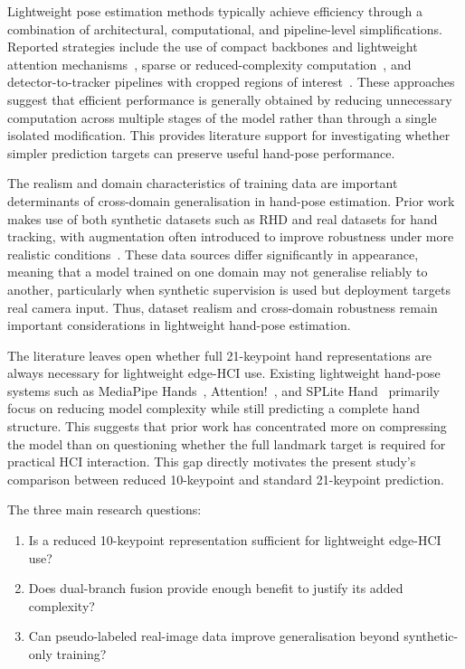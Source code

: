 ﻿\documentclass[10pt,letterpaper]{article}
\begin{document}
\medskip
Lightweight pose estimation methods typically achieve efficiency through a combination of architectural, computational, and pipeline-level simplifications. Reported strategies include the use of compact backbones and lightweight attention mechanisms~\cite{attentionlite}, sparse or reduced-complexity computation~\cite{splitehand}, and detector-to-tracker pipelines with cropped regions of interest~\cite{mediapipe}. These approaches suggest that efficient performance is generally obtained by reducing unnecessary computation across multiple stages of the model rather than through a single isolated modification. This provides literature support for investigating whether simpler prediction targets can preserve useful hand-pose performance.

\medskip
The realism and domain characteristics of training data are important determinants of cross-domain generalisation in hand-pose estimation. Prior work makes use of both synthetic datasets such as RHD and real datasets for hand tracking, with augmentation often introduced to improve robustness under more realistic conditions~\cite{handobjectgcn,lightweightgcnhand,handaugment}. These data sources differ significantly in appearance, meaning that a model trained on one domain may not generalise reliably to another, particularly when synthetic supervision is used but deployment targets real camera input. Thus, dataset realism and cross-domain robustness remain important considerations in lightweight hand-pose estimation.

\medskip
The literature leaves open whether full 21-keypoint hand representations are always necessary for lightweight edge-HCI use. Existing lightweight hand-pose systems such as MediaPipe Hands~\cite{mediapipe}, Attention!~\cite{attentionlite}, and SPLite Hand~\cite{splitehand} primarily focus on reducing model complexity while still predicting a complete hand structure. This suggests that prior work has concentrated more on compressing the model than on questioning whether the full landmark target is required for practical HCI interaction. This gap directly motivates the present study's comparison between reduced 10-keypoint and standard 21-keypoint prediction.

\medskip
The three main research questions:
\begin{enumerate}
    \item Is a reduced 10-keypoint representation sufficient for lightweight edge-HCI use?
    \item Does dual-branch fusion provide enough benefit to justify its added complexity?
    \item Can pseudo-labeled real-image data improve generalisation beyond synthetic-only training?
\end{enumerate}
\end{document}

